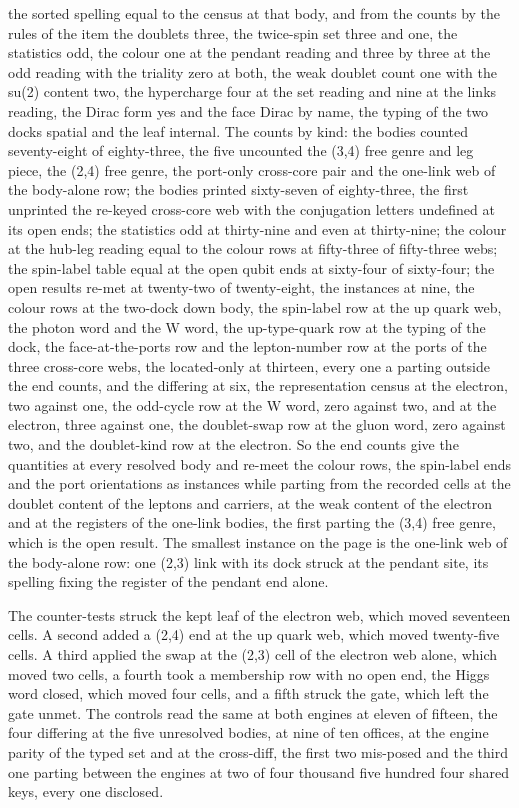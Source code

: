 \begin{chproof}
the sorted spelling equal to the census at that body, and from the counts by the rules of the item the doublets three, the twice-spin set three and one, the statistics odd, the colour one at the pendant reading and three by three at the odd reading with the triality zero at both, the weak doublet count one with the su(2) content two, the hypercharge four at the set reading and nine at the links reading, the Dirac form yes and the face Dirac by name, the typing of the two docks spatial and the leaf internal. The counts by kind: the bodies counted seventy-eight of eighty-three, the five uncounted the (3,4) free genre and leg piece, the (2,4) free genre, the port-only cross-core pair and the one-link web of the body-alone row; the bodies printed sixty-seven of eighty-three, the first unprinted the re-keyed cross-core web with the conjugation letters undefined at its open ends; the statistics odd at thirty-nine and even at thirty-nine; the colour at the hub-leg reading equal to the colour rows at fifty-three of fifty-three webs; the spin-label table equal at the open qubit ends at sixty-four of sixty-four; the open results re-met at twenty-two of twenty-eight, the instances at nine, the colour rows at the two-dock down body, the spin-label row at the up quark web, the photon word and the W word, the up-type-quark row at the typing of the dock, the face-at-the-ports row and the lepton-number row at the ports of the three cross-core webs, the located-only at thirteen, every one a parting outside the end counts, and the differing at six, the representation census at the electron, two against one, the odd-cycle row at the W word, zero against two, and at the electron, three against one, the doublet-swap row at the gluon word, zero against two, and the doublet-kind row at the electron. So the end counts give the quantities at every resolved body and re-meet the colour rows, the spin-label ends and the port orientations as instances while parting from the recorded cells at the doublet content of the leptons and carriers, at the weak content of the electron and at the registers of the one-link bodies, the first parting the (3,4) free genre, which is the open result. The smallest instance on the page is the one-link web of the body-alone row: one (2,3) link with its dock struck at the pendant site, its spelling fixing the register of the pendant end alone.

The counter-tests struck the kept leaf of the electron web, which moved seventeen cells. A second added a (2,4) end at the up quark web, which moved twenty-five cells. A third applied the swap at the (2,3) cell of the electron web alone, which moved two cells, a fourth took a membership row with no open end, the Higgs word closed, which moved four cells, and a fifth struck the gate, which left the gate unmet. The controls read the same at both engines at eleven of fifteen, the four differing at the five unresolved bodies, at nine of ten offices, at the engine parity of the typed set and at the cross-diff, the first two mis-posed and the third one parting between the engines at two of four thousand five hundred four shared keys, every one disclosed.
\end{chproof}
